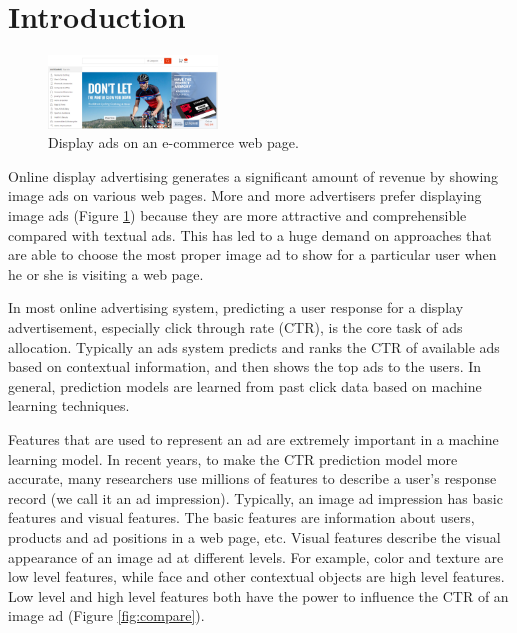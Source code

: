 \documentclass{sig-alternate}
\begin{document}
\section{Introduction}
\begin{figure}
	\centering
	\includegraphics[width=0.4\textwidth]{ad}
	\caption{Display ads on an e-commerce web page.}
	\label{fig:ad}
\end{figure}
Online display advertising generates a significant amount of revenue by showing image ads on various web pages.  More and more advertisers prefer displaying image ads (Figure \ref{fig:ad}) because they are more attractive and comprehensible compared with textual ads. This has led to a huge demand on approaches that are able to choose the most proper image ad to show for a particular user when he or she is visiting a web page. 

In most online advertising system, predicting a user response for a display advertisement, especially click through rate (CTR), is the core task of ads allocation. Typically an ads system  predicts and ranks the CTR of available ads based on contextual information, and then shows the top ads to the users. In general, prediction models are learned from past click data based on machine learning techniques. 

Features that are used to represent an ad are extremely important in a machine learning model. In recent years, to make the CTR prediction model more accurate, many researchers use millions of features to describe a user's response record (we call it an ad impression). Typically, an image ad impression has basic features and visual features. The basic features are information about users, products and ad positions in a web page, etc. Visual features describe the visual appearance of an image ad at different levels. For example, color and  texture are low level features, while face and other contextual objects are high level features. Low level and high level features both have the power to influence the CTR of an image ad (Figure \ref{fig:compare}).
\end{document}
